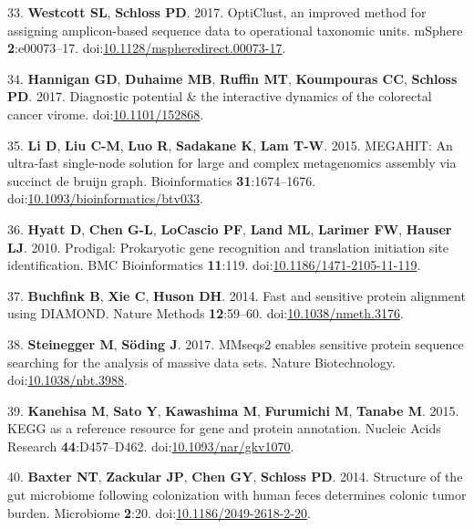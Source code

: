 \documentclass[11pt,]{article}
\begin{document}
\hypertarget{ref-opticlust_westcott2017}{}
33. \textbf{Westcott SL}, \textbf{Schloss PD}. 2017. OptiClust, an
improved method for assigning amplicon-based sequence data to
operational taxonomic units. mSphere \textbf{2}:e00073--17.
doi:\href{https://doi.org/10.1128/mspheredirect.00073-17}{10.1128/mspheredirect.00073-17}.

\hypertarget{ref-Hannigan2017}{}
34. \textbf{Hannigan GD}, \textbf{Duhaime MB}, \textbf{Ruffin MT},
\textbf{Koumpouras CC}, \textbf{Schloss PD}. 2017. Diagnostic potential
\& the interactive dynamics of the colorectal cancer virome.
doi:\href{https://doi.org/10.1101/152868}{10.1101/152868}.

\hypertarget{ref-Li2015}{}
35. \textbf{Li D}, \textbf{Liu C-M}, \textbf{Luo R}, \textbf{Sadakane
K}, \textbf{Lam T-W}. 2015. MEGAHIT: An ultra-fast single-node solution
for large and complex metagenomics assembly via succinct de bruijn
graph. Bioinformatics \textbf{31}:1674--1676.
doi:\href{https://doi.org/10.1093/bioinformatics/btv033}{10.1093/bioinformatics/btv033}.

\hypertarget{ref-Hyatt2010}{}
36. \textbf{Hyatt D}, \textbf{Chen G-L}, \textbf{LoCascio PF},
\textbf{Land ML}, \textbf{Larimer FW}, \textbf{Hauser LJ}. 2010.
Prodigal: Prokaryotic gene recognition and translation initiation site
identification. BMC Bioinformatics \textbf{11}:119.
doi:\href{https://doi.org/10.1186/1471-2105-11-119}{10.1186/1471-2105-11-119}.

\hypertarget{ref-Buchfink2014}{}
37. \textbf{Buchfink B}, \textbf{Xie C}, \textbf{Huson DH}. 2014. Fast
and sensitive protein alignment using DIAMOND. Nature Methods
\textbf{12}:59--60.
doi:\href{https://doi.org/10.1038/nmeth.3176}{10.1038/nmeth.3176}.

\hypertarget{ref-Steinegger2017}{}
38. \textbf{Steinegger M}, \textbf{Söding J}. 2017. MMseqs2 enables
sensitive protein sequence searching for the analysis of massive data
sets. Nature Biotechnology.
doi:\href{https://doi.org/10.1038/nbt.3988}{10.1038/nbt.3988}.

\hypertarget{ref-Kanehisa2015}{}
39. \textbf{Kanehisa M}, \textbf{Sato Y}, \textbf{Kawashima M},
\textbf{Furumichi M}, \textbf{Tanabe M}. 2015. KEGG as a reference
resource for gene and protein annotation. Nucleic Acids Research
\textbf{44}:D457--D462.
doi:\href{https://doi.org/10.1093/nar/gkv1070}{10.1093/nar/gkv1070}.

\hypertarget{ref-scfa_baxter2014}{}
40. \textbf{Baxter NT}, \textbf{Zackular JP}, \textbf{Chen GY},
\textbf{Schloss PD}. 2014. Structure of the gut microbiome following
colonization with human feces determines colonic tumor burden.
Microbiome \textbf{2}:20.
doi:\href{https://doi.org/10.1186/2049-2618-2-20}{10.1186/2049-2618-2-20}.
\end{document}
